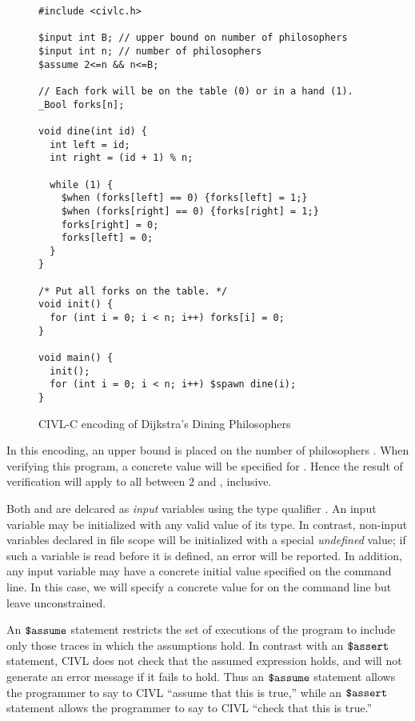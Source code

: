 \begin{figure}
  \begin{small}
\begin{verbatim}
#include <civlc.h>

$input int B; // upper bound on number of philosophers
$input int n; // number of philosophers
$assume 2<=n && n<=B;

// Each fork will be on the table (0) or in a hand (1).
_Bool forks[n];

void dine(int id) {
  int left = id;
  int right = (id + 1) % n;

  while (1) {
    $when (forks[left] == 0) {forks[left] = 1;}
    $when (forks[right] == 0) {forks[right] = 1;}
    forks[right] = 0;
    forks[left] = 0;
  }
}

/* Put all forks on the table. */
void init() {
  for (int i = 0; i < n; i++) forks[i] = 0;
}

void main() {
  init();
  for (int i = 0; i < n; i++) $spawn dine(i);
}
\end{verbatim}
  \end{small}
  \caption{CIVL-C encoding of Dijkstra's Dining Philosophers}
  \label{fig:dining}
\end{figure}

In this encoding, an upper bound  is placed on the number of
philosophers .   When verifying this program, a concrete value
will be specified for .  Hence the result of verification will
apply to all  between $2$ and , inclusive.

Both  and  are delcared as \emph{input} variables using
the type qualifier \cinput.  An input variable may be
initialized with any valid value of its type.  In contrast, non-input
variables declared in file scope will be initialized with a
special \emph{undefined} value; if such a variable is read before it
is defined, an error will be reported. In addition, any input variable
may have a concrete initial value specified on the command line. In
this case, we will specify a concrete value for  on the command
line but leave  unconstrained.

An $\mbox{\texttt{\${}assume}}$ statement restricts the set of executions of the program
to include only those traces in which the assumptions hold. In
contrast with an $\mbox{\texttt{\${}assert}}$ statement, CIVL does not check that the
assumed expression holds, and will not generate an error message if it
fails to hold. Thus an $\mbox{\texttt{\${}assume}}$ statement allows the programmer to
say to CIVL ``assume that this is true,'' while an $\mbox{\texttt{\${}assert}}$
statement allows the programmer to say to CIVL ``check that this is
true.''

